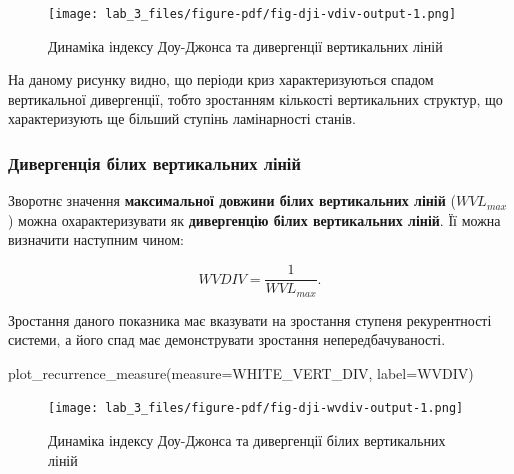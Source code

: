 \documentclass[
  letterpaper,
]{report}
\newenvironment{Shaded}{\begin{snugshade}}{\end{snugshade}}
\newcommand{\NormalTok}[1]{\textcolor[rgb]{0.00,0.23,0.31}{#1}}
\newcommand{\OperatorTok}[1]{\textcolor[rgb]{0.37,0.37,0.37}{#1}}
\newcommand{\StringTok}[1]{\textcolor[rgb]{0.13,0.47,0.30}{#1}}
\begin{document}
\begin{figure}[H]

{\centering \texttt{[image: lab\_3\_files/figure-pdf/fig-dji-vdiv-output-1.png]}

}

\caption{\label{fig-dji-vdiv}Динаміка індексу Доу-Джонса та дивергенції
вертикальних ліній}

\end{figure}

На даному рисунку видно, що періоди криз характеризуються спадом
вертикальної дивергенції, тобто зростанням кількості вертикальних
структур, що характеризують ще більший ступінь ламінарності станів.

\hypertarget{ux434ux438ux432ux435ux440ux433ux435ux43dux446ux456ux44f-ux431ux456ux43bux438ux445-ux432ux435ux440ux442ux438ux43aux430ux43bux44cux43dux438ux445-ux43bux456ux43dux456ux439}{%
\subsubsection{Дивергенція білих вертикальних
ліній}\label{ux434ux438ux432ux435ux440ux433ux435ux43dux446ux456ux44f-ux431ux456ux43bux438ux445-ux432ux435ux440ux442ux438ux43aux430ux43bux44cux43dux438ux445-ux43bux456ux43dux456ux439}}

Зворотнє значення \textbf{максимальної довжини білих вертикальних ліній}
(\(WVL_{max}\)) можна охарактеризувати як \textbf{дивергенцію білих
вертикальних ліній}. Її можна визначити наступним чином:

\[
WVDIV = \frac{1}{WVL_{max}}. 
\]

Зростання даного показника має вказувати на зростання ступеня
рекурентності системи, а його спад має демонструвати зростання
непередбачуваності.

\begin{Shaded}
\begin{Highlighting}[]
\NormalTok{plot\_recurrence\_measure(measure}\OperatorTok{=}\NormalTok{WHITE\_VERT\_DIV, label}\OperatorTok{=}\StringTok{\textquotesingle{}WVDIV\textquotesingle{}}\NormalTok{)}
\end{Highlighting}
\end{Shaded}

\begin{figure}[H]

{\centering \texttt{[image: lab\_3\_files/figure-pdf/fig-dji-wvdiv-output-1.png]}

}

\caption{\label{fig-dji-wvdiv}Динаміка індексу Доу-Джонса та дивергенції
білих вертикальних ліній}

\end{figure}
\end{document}
